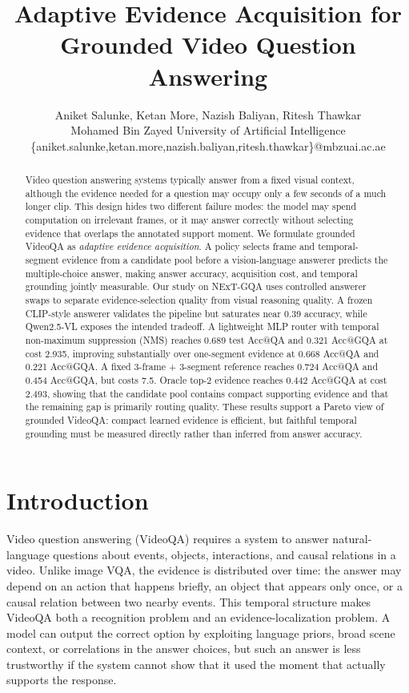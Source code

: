 \documentclass{article}
\title{Adaptive Evidence Acquisition for Grounded Video Question Answering}
\author{
  Aniket Salunke, Ketan More, Nazish Baliyan, Ritesh Thawkar \\
  Mohamed Bin Zayed University of Artificial Intelligence \\
  \{aniket.salunke,ketan.more,nazish.baliyan,ritesh.thawkar\}@mbzuai.ac.ae
}
\begin{document}
\maketitle

\begin{abstract}
Video question answering systems typically answer from a fixed visual context, although the evidence needed for a question may occupy only a few seconds of a much longer clip. This design hides two different failure modes: the model may spend computation on irrelevant frames, or it may answer correctly without selecting evidence that overlaps the annotated support moment. We formulate grounded VideoQA as \emph{adaptive evidence acquisition}. A policy selects frame and temporal-segment evidence from a candidate pool before a vision-language answerer predicts the multiple-choice answer, making answer accuracy, acquisition cost, and temporal grounding jointly measurable. Our study on NExT-GQA uses controlled answerer swaps to separate evidence-selection quality from visual reasoning quality. A frozen CLIP-style answerer validates the pipeline but saturates near 0.39 accuracy, while Qwen2.5-VL exposes the intended tradeoff. A lightweight MLP router with temporal non-maximum suppression (NMS) reaches 0.689 test Acc@QA and 0.321 Acc@GQA at cost 2.935, improving substantially over one-segment evidence at 0.668 Acc@QA and 0.221 Acc@GQA. A fixed 3-frame + 3-segment reference reaches 0.724 Acc@QA and 0.454 Acc@GQA, but costs 7.5. Oracle top-2 evidence reaches 0.442 Acc@GQA at cost 2.493, showing that the candidate pool contains compact supporting evidence and that the remaining gap is primarily routing quality. These results support a Pareto view of grounded VideoQA: compact learned evidence is efficient, but faithful temporal grounding must be measured directly rather than inferred from answer accuracy.
\end{abstract}

\section{Introduction}
Video question answering (VideoQA) requires a system to answer natural-language questions about events, objects, interactions, and causal relations in a video. Unlike image VQA, the evidence is distributed over time: the answer may depend on an action that happens briefly, an object that appears only once, or a causal relation between two nearby events. This temporal structure makes VideoQA both a recognition problem and an evidence-localization problem. A model can output the correct option by exploiting language priors, broad scene context, or correlations in the answer choices, but such an answer is less trustworthy if the system cannot show that it used the moment that actually supports the response.
\end{document}
